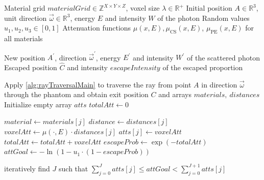 \begin{algorithm}[H]
    \caption{Forced Fixed Detection: Step}
    \label{alg:forcedDetectionStep}
    \begin{algorithmic}[1]
        \Require Material grid $materialGrid \in \mathbb{Z}^{X \times Y \times
        Z}$, voxel size $\lambda \in \mathbb{R}^+$
        \Require Initial position $A \in \mathbb{R}^3$, unit direction $\vec{\omega} \in \mathbb{R}^3$, energy $E$ and intensity $W$ of 
        \Statex {}the photon
        \Require Random values $u_1, u_2, u_3 \in [0,1]$
        \Require Attenuation functions $\mu(x,E), \mu_\textrm{CS}(x,E)$, $\mu_\textrm{PE}(x,E)$ for all materials

        \Ensure New position $A^\prime$, direction $\vec{\omega}^\prime$, energy $E^\prime$ and intensity $W^\prime$ of the scattered photon
        \Ensure Escaped position $\hat{C}$ and intensity $escapeIntensity$ of the escaped proportion

        \State Apply \autoref{alg:rayTraversalMain} to traverse the ray from point $A$ in direction $\vec{\omega}$ through
        the phantom and obtain exit position $C$ and arrays $materials,\
        distances$
        \State Initialize empty array $atts$
        \State $totalAtt \gets 0$
        
            \State $material \gets materials[j]$
            \State $distance \gets distances[j]$
            \State $voxelAtt \gets \mu(\cdot, E)\cdot distances[j]$ 
            \State $atts[j] \gets voxelAtt$
            \State $totalAtt \gets totalAtt + voxelAtt$
        \EndFor
        \State $escapeProb \gets \exp(-totalAtt)$
        \State $attGoal \gets -\ln(1 - u_1 \cdot (1 - escapeProb))$

        \State iteratively find $J$ such that $\sum\limits_{j=0}^{J} atts[j] \leq attGoal < \sum\limits_{j=0}^{J+1} atts[j]$ \label{alg:forcedDetectionStep:line:freePathLength}


\end{algorithmic}
\end{algorithm}
